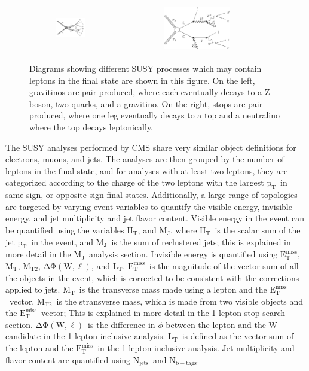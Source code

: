 \documentclass{article}
\newcommand{\MET}{${\mathrm{E_{T}^{miss}}}$}
\newcommand{\pt}{${\mathrm{p_{T}}}$}
\newcommand{\HT}{$\mathrm{H_T}$}
\newcommand{\MJ}{$\mathrm{M_J}$}
\newcommand{\MT}{$\mathrm{M_T}$}
\newcommand{\MTtwo}{$\mathrm{M_{T2}}$}
\newcommand{\LT}{$\mathrm{L_T}$}
\newcommand{\dphiwl}{$\mathrm{\Delta\Phi(W, \ell)}$}
\newcommand{\njets}{$\mathrm{N_{jets}}$}
\newcommand{\nbtags}{$\mathrm{N_{b-tags}}$}
\begin{document}
\begin{figure}[!htb]
\begin{center}
\begin{tabular}{cc}
\includegraphics[width=0.4\textwidth]{intro/Feynman_graph_T5ZZgmsb.pdf} &
\includegraphics[width=0.4\textwidth]{intro/T2tt.pdf}
\end{tabular}
\caption{
\label{fig:SMS}
Diagrams showing different SUSY processes which may contain leptons in the final state are shown in this figure.
On the left, gravitinos are pair-produced, where each eventually decays to a Z boson, two quarks, and a gravitino.
On the right, stops are pair-produced, where one leg eventually decays to a top and a neutralino where the top decays leptonically.
}
\end{center}
\end{figure}

The SUSY analyses performed by CMS share very similar object definitions for electrons, muons, and jets. 
The analyses are then grouped by the number of leptons in the final state,
and for analyses with at least two leptons,
they are categorized according to the charge of the two leptons with the largest \pt\
in same-sign, or opposite-sign final states.
Additionally, a large range of topologies are targeted by varying event variables to quantify the visible energy, invisible energy, and jet multiplicity and jet flavor content.
Visible energy in the event can be quantified using the variables \HT, and \MJ,
where \HT\ is the scalar sum of the jet \pt\ in the event,
and \MJ\ is the sum of reclustered jets; this is explained in more detail in the \MJ\ analysis section.
Invisible energy is quantified using \MET, \MT, \MTtwo, \dphiwl, and \LT.
\MET\ is the magnitude of the vector sum of all the objects in the event, which is corrected to be consistent with the corrections applied to jets.
\MT\ is the transverse mass made using a lepton and the \MET\ vector.
\MTtwo\ is the stransverse mass, which is made from two visible objects and the \MET\ vector; This is explained in more detail in the 1-lepton stop search section.
\dphiwl\ is the difference in $\phi$ between the lepton and the W-candidate in the 1-lepton inclusive analysis.
\LT\ is defined as the vector sum of the lepton and the \MET\ in the 1-lepton inclusive analysis.
Jet multiplicity and flavor content are quantified using \njets\ and \nbtags.
\end{document}
